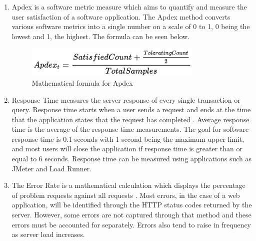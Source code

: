 \documentclass{article}
\begin{document}
   \begin{enumerate}
\item Apdex is a software metric measure which aims to quantify and measure the user satisfaction of a software application. The Apdex method converts various software metrics into a single number on a scale of 0 to 1, 0 being the lowest and 1, the highest. The formula can be seen below.\newline
       
       \begin{figure}[ht!]
       	\includegraphics[width =0.8\textwidth, right]{images/sjGUFG.png}
       	\caption{Mathematical formula for Apdex}
       \end{figure}
       
       \item Response Time measures the server response of every single transaction or query. Response time starts when a user sends a request and ends at the time that the application states that the request has completed \cite{guru}. Average response time is the average of the response time measurements. The goal for software response time is 0.1 seconds with 1 second being the maximum upper limit, and most users will close the application if response time is greater than or equal to 6 seconds. Response time can be measured using applications such as JMeter and Load Runner.
       
        \item The Error Rate is a mathematical calculation which displays the percentage of problem requests against all requests \cite{guru}. Most errors, in the case of a web application, will be identified through the HTTP status codes returned by the server. However, some errors are not captured through that method and these errors must be accounted for separately. Errors also tend to raise in frequency as server load increases.

       
   \end{enumerate}
\end{document}
